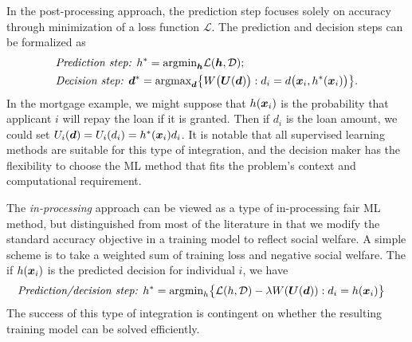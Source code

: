 \documentclass{article}[11pt]
\begin{document}
In the post-processing approach, the prediction step focuses solely on accuracy through minimization of a loss function $\mathcal{L}$.  The prediction and decision steps can be formalized as
\begin{gather*}
\begin{aligned}
    & \textit{Prediction step: } h^* = \text{argmin}_{\bm{h}} \mathcal{L}(\bm{h},\mathcal{D}); \\
    & \textit{Decision step: } \bm{d}^* = \text{argmax}_{\bm{d}} \big\{W\big(\bm{U}(\bm{d})\big): d_i = d\big(\bm{x}_i, h^*(\bm{x}_i)\big)\big\}.
\end{aligned}
\end{gather*}
In the mortgage example, we might suppose that $h(\bm{x}_i)$ is the probability that applicant $i$ will repay the loan if it is granted.  Then if $d_i$ is the loan amount, we could set $U_i(\bm{d})=U_i(d_i)=h^*(\bm{x}_i)d_i$.  It is notable that all supervised learning methods are suitable for this type of integration, and the decision maker has the flexibility to choose the ML method that fits the problem's context and computational requirement.   

The {\em in-processing} approach can be viewed as a type of in-processing fair ML method, but distinguished from most of the literature in that we modify the standard accuracy objective in a training model to reflect social welfare. A simple scheme is to take a weighted sum of training loss and negative social welfare. The if $h(\bm{x}_i)$ is the predicted decision for individual $i$, we have
\begin{align*}
    & \textit{Prediction/decision step: } 
    h^* = \text{argmin}_h \big\{ \mathcal{L} (h,\mathcal{D}) 
    - \lambda W(\bm{U}(\bm{d})) : d_i=h(\bm{x}_i) \big\}
\end{align*}
The success of this type of integration is contingent on whether the resulting training model can be solved efficiently.
\end{document}
